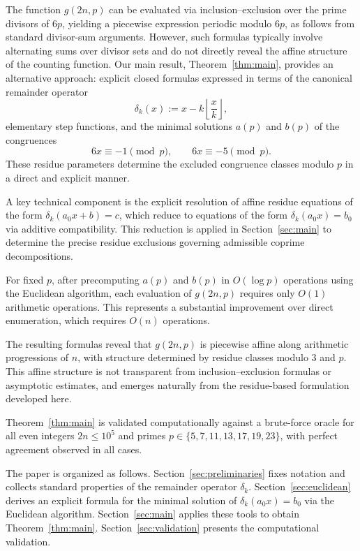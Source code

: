 \documentclass[12pt]{article}
\begin{document}
The function $g(2n,p)$ can be evaluated via inclusion--exclusion
over the prime divisors of $6p$, yielding a piecewise expression
periodic modulo $6p$, as follows from standard divisor-sum arguments.
However, such formulas typically involve alternating sums over divisor
sets and do not directly reveal the affine structure of the counting
function. Our main result, Theorem~\ref{thm:main}, provides an
alternative approach: explicit closed formulas expressed in terms of
the canonical remainder operator
\[
\delta_k(x) := x - k\left\lfloor\frac{x}{k}\right\rfloor,
\]
elementary step functions, and the minimal solutions $a(p)$ and $b(p)$
of the congruences
\[
6x \equiv -1 \pmod{p},
\qquad
6x \equiv -5 \pmod{p}.
\]
These residue parameters determine the excluded congruence classes
modulo $p$ in a direct and explicit manner.

A key technical component is the explicit resolution of affine residue
equations of the form $\delta_k(a_0 x + b) = c$, which reduce to
equations of the form $\delta_k(a_0 x) = b_0$ via additive compatibility.
This reduction is applied in Section~\ref{sec:main} to determine the
precise residue exclusions governing admissible coprime decompositions.

For fixed $p$, after precomputing $a(p)$ and $b(p)$ in $O(\log p)$
operations using the Euclidean algorithm, each evaluation of $g(2n,p)$
requires only $O(1)$ arithmetic operations. This represents a substantial
improvement over direct enumeration, which requires $O(n)$ operations.

The resulting formulas reveal that $g(2n,p)$ is piecewise affine along
arithmetic progressions of $n$, with structure determined by residue
classes modulo $3$ and $p$. This affine structure is not transparent
from inclusion--exclusion formulas or asymptotic estimates, and emerges
naturally from the residue-based formulation developed here.

Theorem~\ref{thm:main} is validated computationally against a brute-force
oracle for all even integers $2n \le 10^5$ and primes
$p \in \{5,7,11,13,17,19,23\}$, with perfect agreement observed in
all cases.

The paper is organized as follows.
Section~\ref{sec:preliminaries} fixes notation and collects standard
properties of the remainder operator $\delta_k$.
Section~\ref{sec:euclidean} derives an explicit formula for the minimal
solution of $\delta_k(a_0 x)=b_0$ via the Euclidean algorithm.
Section~\ref{sec:main} applies these tools to obtain
Theorem~\ref{thm:main}.
Section~\ref{sec:validation} presents the computational validation.
\end{document}
